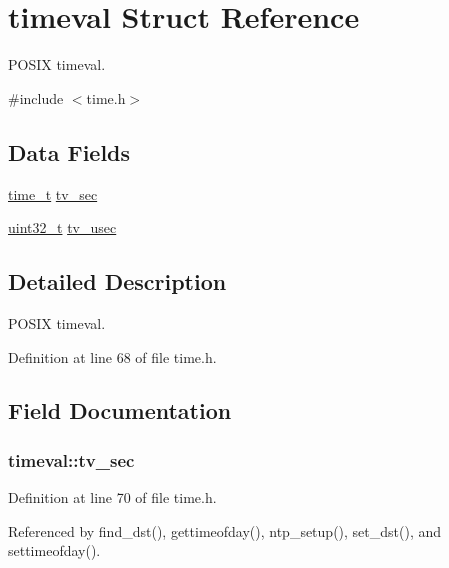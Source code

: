 \hypertarget{structtimeval}{}\section{timeval Struct Reference}
\label{structtimeval}


P\+O\+S\+IX timeval.  




{\ttfamily \#include $<$time.\+h$>$}

\subsection*{Data Fields}
\begin{DoxyCompactItemize}
\item 
\hyperlink{time_8h_a3346b04b0420b32ccf6b706551b70762}{time\+\_\+t} \hyperlink{structtimeval_aef6ddab1064c430758f9f913b7e4a21e}{tv\+\_\+sec}
\item 
\hyperlink{send_8c_a435d1572bf3f880d55459d9805097f62}{uint32\+\_\+t} \hyperlink{structtimeval_a8fd7abf5420981b3ff58bb23df458587}{tv\+\_\+usec}
\end{DoxyCompactItemize}


\subsection{Detailed Description}
P\+O\+S\+IX timeval. 

Definition at line 68 of file time.\+h.



\subsection{Field Documentation}
\subsubsection[{\texorpdfstring{tv\+\_\+sec}{tv_sec}}]{ timeval\+::tv\+\_\+sec}\hypertarget{structtimeval_aef6ddab1064c430758f9f913b7e4a21e}{}\label{structtimeval_aef6ddab1064c430758f9f913b7e4a21e}


Definition at line 70 of file time.\+h.



Referenced by find\+\_\+dst(), gettimeofday(), ntp\+\_\+setup(), set\+\_\+dst(), and settimeofday().

